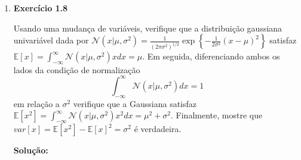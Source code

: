 \begin{enumerate}
\item \textbf{Exercício 1.8} \par

Usando uma mudança de variáveis, verifique que a distribuição gaussiana univariável dada por $\mathcal{N}(x | \mu, \sigma^2)= \frac{1}{(2\pi\sigma^2)^{1/2}}\exp\left\{ -\frac{1}{2\sigma^2}(x - \mu)^2 \right\}$ satisfaz $\mathbb{E}[x] = \int_{-\infty}^{\infty}\mathcal{N}(x | \mu, \sigma^2)x dx=\mu $. Em seguida, diferenciando ambos os lados da condição de normalização
\begin{equation*}
    \int_{-\infty}^{\infty}\mathcal{N}(x | \mu, \sigma^2)dx=1
\end{equation*}
em relação a $\sigma^2$ verifique que a Gaussiana satisfaz  $\mathbb{E}[x^2] = \int_{-\infty}^{\infty}\mathcal{N}(x | \mu, \sigma^2)x^2 dx=\mu^2+\sigma^2 $. Finalmente, mostre que $var[x]=\mathbb{E}[x^2]-\mathbb{E}[x]^2=\sigma^2$ é verdadeira. 
\newpage \par
\textbf{Solução:}


\end{enumerate}

